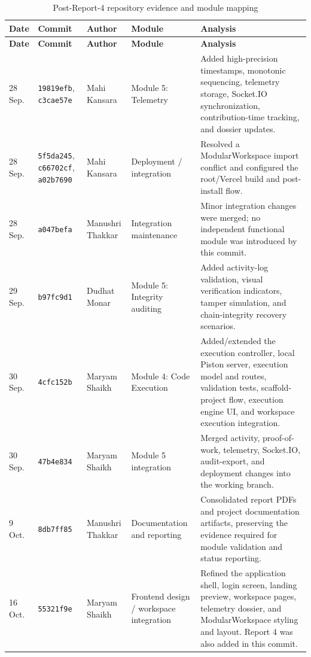 \documentclass[11pt,a4paper]{article}
\begin{document}
\small
\begin{longtable}{p{1.6cm} p{1.8cm} p{2.0cm} p{2.3cm} p{4.4cm}}
\caption{Post-Report-4 repository evidence and module mapping}\label{tab:commit-analysis}\\
\toprule
\textbf{Date} & \textbf{Commit} & \textbf{Author} & \textbf{Module} & \textbf{Analysis} \\
\midrule
\endfirsthead
\toprule
\textbf{Date} & \textbf{Commit} & \textbf{Author} & \textbf{Module} & \textbf{Analysis} \\
\midrule
\endhead
28 Sep. & \texttt{19819efb}, \texttt{c3cae57e} & Mahi Kansara & Module 5: Telemetry & Added high-precision timestamps, monotonic sequencing, telemetry storage, Socket.IO synchronization, contribution-time tracking, and dossier updates. \\
28 Sep. & \texttt{5f5da245}, \texttt{c66702cf}, \texttt{a02b7690} & Mahi Kansara & Deployment / integration & Resolved a ModularWorkspace import conflict and configured the root/Vercel build and post-install flow. \\
28 Sep. & \texttt{a047befa} & Manushri Thakkar & Integration maintenance & Minor integration changes were merged; no independent functional module was introduced by this commit. \\
29 Sep. & \texttt{b97fc9d1} & Dudhat Monar & Module 5: Integrity auditing & Added activity-log validation, visual verification indicators, tamper simulation, and chain-integrity recovery scenarios. \\
30 Sep. & \texttt{4cfc152b} & Maryam Shaikh & Module 4: Code Execution & Added/extended the execution controller, local Piston server, execution model and routes, validation tests, scaffold-project flow, execution engine UI, and workspace execution integration. \\
30 Sep. & \texttt{47b4e834} & Maryam Shaikh & Module 5 integration & Merged activity, proof-of-work, telemetry, Socket.IO, audit-export, and deployment changes into the working branch. \\
9 Oct. & \texttt{8db7ff85} & Manushri Thakkar & Documentation and reporting & Consolidated report PDFs and project documentation artifacts, preserving the evidence required for module validation and status reporting. \\
16 Oct. & \texttt{55321f9e} & Maryam Shaikh & Frontend design / workspace integration & Refined the application shell, login screen, landing preview, workspace pages, telemetry dossier, and ModularWorkspace styling and layout. Report 4 was also added in this commit. \\
\bottomrule
\end{longtable}
\normalsize
\end{document}
